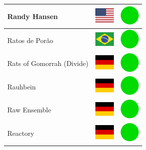 \documentclass[12pt, a4paper, twoside]{report}
\begin{document}
\begin{center}
\begin{longtable}{|p{5cm}|p{2cm}|p{2cm}|}
 Randy Hansen                                               & \includegraphics[width=1cm]{../4x3/us} &   \includegraphics[width=1cm]{../likes/y} \\ \hline
 Ratos de Porão                                             & \includegraphics[width=1cm]{../4x3/br} &   \includegraphics[width=1cm]{../likes/y} \\ \hline
 Rats of Gomorrah (Divide)                                  & \includegraphics[width=1cm]{../4x3/de} &   \includegraphics[width=1cm]{../likes/y} \\ \hline
 Rauhbein                                                   & \includegraphics[width=1cm]{../4x3/de} &   \includegraphics[width=1cm]{../likes/y} \\ \hline
 Raw Ensemble                                               & \includegraphics[width=1cm]{../4x3/de} &   \includegraphics[width=1cm]{../likes/y} \\ \hline
 Reactory                                                   & \includegraphics[width=1cm]{../4x3/de} &   \includegraphics[width=1cm]{../likes/y} \\ \hline

\end{longtable}
\end{center}
\end{document}
